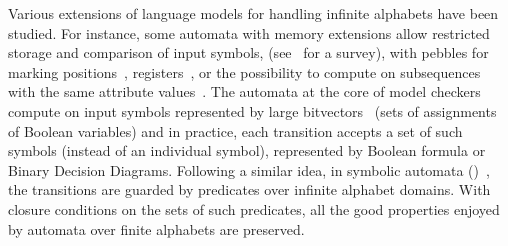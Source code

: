 Various extensions of language models for handling infinite alphabets have been studied.
For instance, some automata with memory extensions 
allow restricted storage and comparison of input symbols, 
(see~\cite{Segoufin06csl} for a survey),
with pebbles for marking positions~\cite{NevenSchwentickVianu04FSMinfinite}, 
registers~\cite{KaminskiFrancez94}, 
or %
the possibility to compute on subsequences 
with the same attribute values~\cite{Bojanczyk11FO2}. %
%
The automata at the core of model checkers
compute on input symbols represented by large bitvectors~\cite{Vardi07ciaa} %
(sets of assignments of Boolean variables) %
and in practice,  %
each transition accepts a set of such symbols (instead of an individual symbol), 
represented by Boolean formula or Binary Decision Diagrams.
%
Following a similar idea, %
in symbolic automata (\SA)~\cite{dAntoniVeanes17CAV,dAntoni21CACM}, 
the transitions are guarded by predicates over infinite alphabet domains.
With closure conditions on the sets of such predicates, %
all the good properties enjoyed by automata over finite alphabets are preserved.

